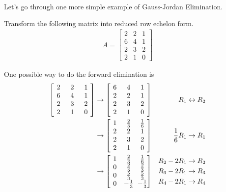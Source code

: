 Let's go through one more simple example of Gauss-Jordan Elimination.
\begin{exmp}
\label{exmp:rref2}
Transform the following matrix into reduced row echelon form.
\begin{align*}
A =
\begin{bmatrix}
2 & 2 & 1 \\
6 & 4 & 1 \\
2 & 3 & 2 \\
2 & 1 & 0
\end{bmatrix}    
\end{align*}
\end{exmp}
\begin{solution}
One possible way to do the forward elimination is
\begin{align*}
\left[\begin{array}{@{\,}wc{10pt}wc{10pt}wc{10pt}@{\,}}
2 & 2 & 1 \\
6 & 4 & 1 \\
2 & 3 & 2 \\
2 & 1 & 0
\end{array}\right]
&\to
\left[\begin{array}{@{\,}wc{10pt}wc{10pt}wc{10pt}@{\,}}
6 & 4 & 1 \\
2 & 2 & 1 \\
2 & 3 & 2 \\
2 & 1 & 0
\end{array}\right]
& R_1 \leftrightarrow R_2 \\
&\to
\left[\begin{array}{@{\,}wc{10pt}wc{10pt}wc{10pt}@{\,}}
1 & \frac{2}{3} & \frac{1}{6} \\
2 & 2 & 1 \\
2 & 3 & 2 \\
2 & 1 & 0
\end{array}\right]
& \frac{1}{6}R_1 \to R_1 \\
&\to
\left[\begin{array}{@{\,}wc{10pt}wc{10pt}wc{10pt}@{\,}}
1 & \frac{2}{3} & \frac{1}{6} \\
0 & \frac{2}{3} & \frac{2}{3} \\
0 & \frac{5}{3} & \frac{5}{3} \\
0 & -\frac{1}{3} & -\frac{1}{3}
\end{array}\right]
& 
\begin{aligned}
R_2 - 2R_1 &\to R_2 \\
R_3 - 2R_1 &\to R_3 \\
R_4 - 2R_1 &\to R_4 
\end{aligned}\\

\end{align*}
\end{solution}
